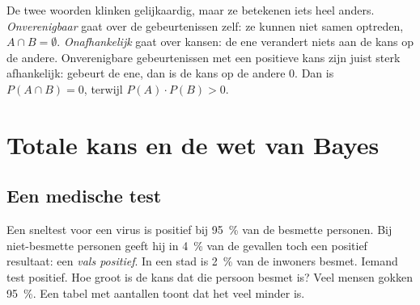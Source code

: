 De twee woorden klinken gelijkaardig, maar ze betekenen iets heel anders. \textit{Onverenigbaar} gaat over de gebeurtenissen zelf: ze kunnen niet samen optreden, $A \cap B = \emptyset$. \textit{Onafhankelijk} gaat over kansen: de ene verandert niets aan de kans op de andere. Onverenigbare gebeurtenissen met een positieve kans zijn juist sterk afhankelijk: gebeurt de ene, dan is de kans op de andere 0. Dan is $P(A \cap B) = 0$, terwijl $P(A) \cdot P(B) > 0$.


\begin{oefeningen}
\end{oefeningen}

\section{Totale kans en de wet van Bayes}

\subsection{Een medische test}

Een sneltest voor een virus is positief bij 95~\% van de besmette personen. Bij niet-besmette personen geeft hij in 4~\% van de gevallen toch een positief resultaat: een \textit{vals positief}. In een stad is 2~\% van de inwoners besmet. Iemand test positief. Hoe groot is de kans dat die persoon besmet is? Veel mensen gokken 95~\%. Een tabel met aantallen toont dat het veel minder is.


